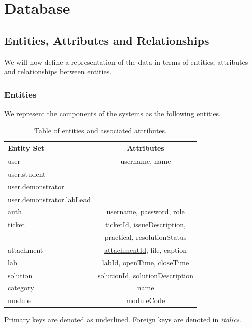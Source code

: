 \section{Database}

\subsection{Entities, Attributes and Relationships}
We will now define a representation of the data in terms of entities, attributes and relationships between entities.

\subsubsection{Entities}

We represent the components of the systems as the following entities. 

\FloatBarrier
\begin{table}[H]
\centering
\begin{tabular}{ |l|c| } 
 \hline
 \textbf{Entity Set} & \textbf{Attributes}\\ 
 \hline
  user & \underline{username}, name\\ 
 \hspace{6pt}user.student & \\ 
 \hspace{6pt}user.demonstrator & \\
 \hspace{12pt}user.demonstrator.labLead & \\
 auth & \underline{username}, password, role \\
 ticket & \underline{ticketId}, issueDescription,\\
 & practical, resolutionStatus \\
 attachment & \underline{attachmentId}, file, caption \\
 lab & \underline{labId}, openTime, closeTime\\
 solution & \underline{solutionId}, solutionDescription\\
 category & \underline{name} \\
 module & \underline{moduleCode} \\
 \hline
\end{tabular}
\caption{Table of entities and associated attributes.}
\end{table}
\FloatBarrier

Primary keys are denoted as \underline{underlined}. Foreign keys are denoted in \textit{italics}.

